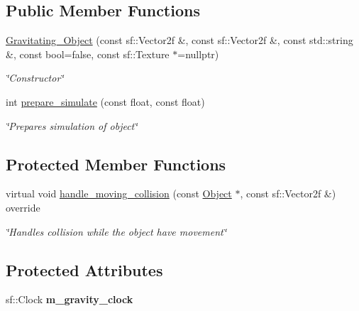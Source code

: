 \subsection*{Public Member Functions}
\begin{DoxyCompactItemize}
\item 
\hyperlink{classGravitating__Object_a7319a97eb2d84afbe66c5e0040bd3973}{Gravitating\+\_\+\+Object} (const sf\+::\+Vector2f \&, const sf\+::\+Vector2f \&, const std\+::string \&, const bool=false, const sf\+::\+Texture $\ast$=nullptr)
\begin{DoxyCompactList}\small\item\em \char`\"{}\+Constructor\char`\"{} \end{DoxyCompactList}\item 
int \hyperlink{classGravitating__Object_a187404d6df6ff16a86a33a3f4a8aab85}{prepare\+\_\+simulate} (const float, const float)
\begin{DoxyCompactList}\small\item\em \char`\"{}\+Prepares simulation of object\char`\"{} \end{DoxyCompactList}\end{DoxyCompactItemize}
\subsection*{Protected Member Functions}
\begin{DoxyCompactItemize}
\item 
virtual void \hyperlink{classGravitating__Object_ad059f059b3699edb3edff11fdd7fba29}{handle\+\_\+moving\+\_\+collision} (const \hyperlink{classObject}{Object} $\ast$, const sf\+::\+Vector2f \&) override
\begin{DoxyCompactList}\small\item\em \char`\"{}\+Handles collision while the object have movement\char`\"{} \end{DoxyCompactList}\end{DoxyCompactItemize}
\subsection*{Protected Attributes}
\begin{DoxyCompactItemize}
\item 
\hypertarget{classGravitating__Object_abda4e488702c931d99b47785db6be33b}{sf\+::\+Clock {\bfseries m\+\_\+gravity\+\_\+clock}}\label{classGravitating__Object_abda4e488702c931d99b47785db6be33b}

\end{DoxyCompactItemize}


